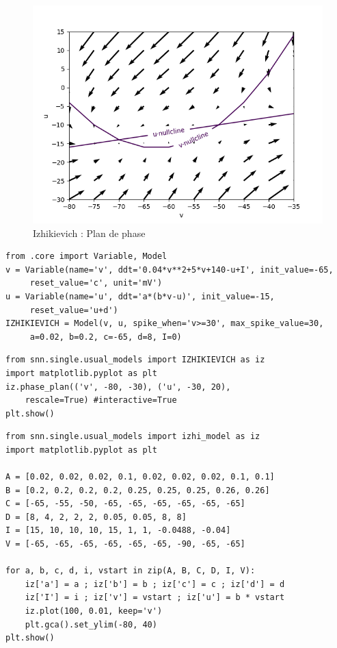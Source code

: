 \documentclass[12pt]{scrartcl}
\begin{document}
\begin{figure}[!h]
\centering
\includegraphics[scale=0.8]{imgs/izPDP.png}
\caption{ Izhikievich : Plan de phase}
\label{izPDP}
\end{figure}
\clearpage
\begin{lstlisting}[caption = {Izhikievich : Définition du modèle}]
from .core import Variable, Model
v = Variable(name='v', ddt='0.04*v**2+5*v+140-u+I', init_value=-65, 
     reset_value='c', unit='mV')
u = Variable(name='u', ddt='a*(b*v-u)', init_value=-15,
     reset_value='u+d')
IZHIKIEVICH = Model(v, u, spike_when='v>=30', max_spike_value=30, 
     a=0.02, b=0.2, c=-65, d=8, I=0) 
\end{lstlisting}

\begin{lstlisting}[caption = {Izhikievich : Plan de phase}]
from snn.single.usual_models import IZHIKIEVICH as iz
import matplotlib.pyplot as plt
iz.phase_plan(('v', -80, -30), ('u', -30, 20), 
    rescale=True) #interactive=True
plt.show()
\end{lstlisting}

\begin{lstlisting}[caption = {Izhikievich : Evolution du potentiel de membrane en fonction du temps pour plusieurs ensembles de paramètres}]
from snn.single.usual_models import izhi_model as iz
import matplotlib.pyplot as plt

A = [0.02, 0.02, 0.02, 0.1, 0.02, 0.02, 0.02, 0.1, 0.1]
B = [0.2, 0.2, 0.2, 0.2, 0.25, 0.25, 0.25, 0.26, 0.26]
C = [-65, -55, -50, -65, -65, -65, -65, -65, -65]
D = [8, 4, 2, 2, 2, 0.05, 0.05, 8, 8]
I = [15, 10, 10, 10, 15, 1, 1, -0.0488, -0.04]
V = [-65, -65, -65, -65, -65, -65, -90, -65, -65]

for a, b, c, d, i, vstart in zip(A, B, C, D, I, V):
    iz['a'] = a ; iz['b'] = b ; iz['c'] = c ; iz['d'] = d
    iz['I'] = i ; iz['v'] = vstart ; iz['u'] = b * vstart
    iz.plot(100, 0.01, keep='v')
    plt.gca().set_ylim(-80, 40)
plt.show()
\end{lstlisting}
\end{document}

